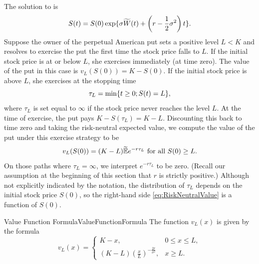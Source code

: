 The solution to  is
\begin{equation} \label{eq:StockPriceSolution}
	S(t) = S(0) \exp \{ \sigma \widetilde{W}(t) + \left( r - \frac{1}{2}\sigma^2 \right) t \}.
\end{equation}
Suppose the owner of the perpetual American put sets a positive level $L < K$ and resolves to exercise the put the first time the stock price falls to $L$. If the initial stock price is at or below $L$, she exercises immediately (at time zero). The value of the put in this case is $v_L(S(0)) = K - S(0)$. If the initial stock price is above $L$, she exercises at the stopping time
\begin{equation} \label{eq:StoppingTime}
	\tau_L = \min\{t \ge 0; S(t) = L\},
\end{equation}
where $\tau_L$ is set equal to $\infty$ if the stock price never reaches the level $L$. At the time of exercise, the put pays $K - S(\tau_L) = K - L$. Discounting this back to time zero and taking the risk-neutral expected value, we compute the value of the put under this exercise strategy to be
\begin{equation} \label{eq:RiskNeutralValue}
	v_L(S(0)) = (K - L) \widetilde{\mathbb{E}}e^{-r\tau_L} \text{ for all } S(0) \ge L.
\end{equation}
On those paths where $\tau_L = \infty$, we interpret $e^{-r\tau_L}$ to be zero. (Recall our assumption at the beginning of this section that $r$ is strictly positive.) Although not explicitly indicated by the notation, the distribution of $\tau_L$ depends on the initial stock price $S(0)$, so the right-hand side \eqref{eq:RiskNeutralValue} is a function of $S(0)$.

\begin{lem}{Value Function Formula}{ValueFunctionFormula}
	The function $v_L(x)$ is given by the formula
	\begin{equation} \label{eq:ValueFunctionPiecewise}
		v_L(x) = \begin{cases}
			K - x,                                                     & 0 \le x \le L, \\
			(K - L) \left( \frac{x}{L} \right)^{-\frac{2r}{\sigma^2}}, & x \ge L.
		\end{cases}
	\end{equation}
\end{lem}

